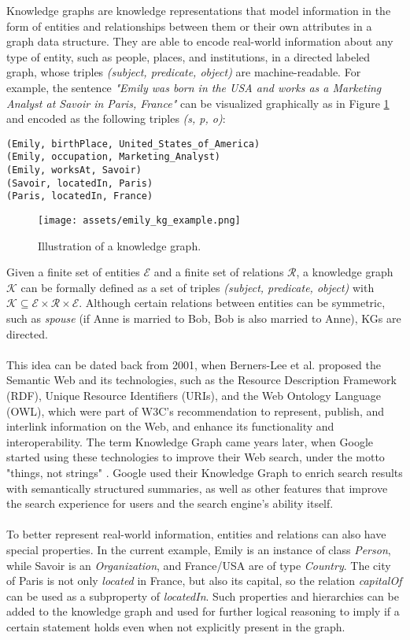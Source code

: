 \documentclass[11pt,titlepage,oneside,openany]{book}
\begin{document}
Knowledge graphs are knowledge representations that model information in the form of entities and relationships between them or their own attributes in a graph data structure. They are able to encode real-world information about any type of entity, such as people, places, and institutions, in a directed labeled graph, whose triples \textit{(subject, predicate, object)} are machine-readable. For example, the sentence \textit{"Emily was born in the USA and works as a Marketing Analyst at Savoir in Paris, France"} can be visualized graphically as in Figure \ref{fig:kg-example} and encoded as the following triples \textit{(s, p, o)}:\\
\begin{verbatim}
(Emily, birthPlace, United_States_of_America)
(Emily, occupation, Marketing_Analyst)
(Emily, worksAt, Savoir)
(Savoir, locatedIn, Paris)
(Paris, locatedIn, France)
\end{verbatim}
\begin{figure}[H]
    \centering
    \centerline{\texttt{[image: assets/emily\_kg\_example.png]}}
    \caption{Illustration of a knowledge graph.}
    \label{fig:kg-example}
\end{figure}
Given a finite set of entities $\mathcal{E}$ and a finite set of relations $\mathcal{R}$, a knowledge graph $\mathcal{K}$ can be formally defined as a set of triples \textit{(subject, predicate, object)} with $\mathcal{K} \subseteq \mathcal{E} \times \mathcal{R} \times \mathcal{E}$. Although certain relations between entities can be symmetric, such as \textit{spouse} (if Anne is married to Bob, Bob is also married to Anne), KGs are directed. \\
\\
This idea can be dated back from 2001, when Berners-Lee et al. proposed the Semantic Web \cite{berners-lee_semantic_2001} and its technologies, such as the Resource Description Framework (RDF), Unique Resource Identifiers (URIs), and the Web Ontology Language (OWL), which were part of W3C's recommendation to represent, publish, and interlink information on the Web, and enhance its functionality and interoperability. The term Knowledge Graph came years later, when Google started using these technologies to improve their Web search, under the motto "things, not strings" \cite{singhal_introducing_2012}. Google used their Knowledge Graph to enrich search results with semantically structured summaries, as well as other features that improve the search experience for users and the search engine's ability itself. \\
\\
To better represent real-world information, entities and relations can also have special properties. In the current example, Emily is an instance of class \textit{Person}, while Savoir is an \textit{Organization}, and France/USA are of type \textit{Country}. The city of Paris is not only \textit{located} in France, but also its capital, so the relation \textit{capitalOf} can be used as a subproperty of \textit{locatedIn}. Such properties and hierarchies can be added to the knowledge graph and used for further logical reasoning to imply if a certain statement holds even when not explicitly present in the graph.
\end{document}
